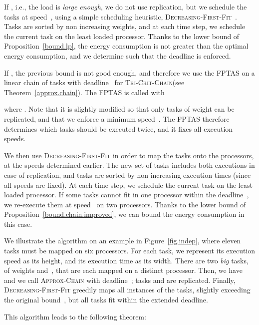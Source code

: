 \documentclass[a4paper]{article}
\theoremstyle{plain}
\theoremstyle{definition}
\theoremstyle{remark}
\newcommand{\dff}{\textsc{Dec\-reasing-First-Fit}\xspace}
\newcommand{\approxchain}{\textsc{Ap\-prox-Chain}}
\newcommand{\chain}{\textsc{Tri-Crit-Chain}\xspace}
\begin{document}
\begin{compactitem}


\item If , i.e., the load is {\em large enough}, we do not use replication, but we
  schedule the tasks at
  speed~, using a simple scheduling heuristic, \dff~\cite{Graham69}. Tasks
  are sorted by non increasing weights, and at each time step, we
  schedule the current task on the least loaded processor. Thanks to
  the lower bound of Proposition~\ref{bound.lp}, the energy
  consumption is not greater than the optimal energy consumption, and
  we determine  such that the deadline is
  enforced.  

\item If , the previous bound is not good enough, and therefore we use the
  FPTAS on a linear chain of tasks with deadline~ for \chain (see
  Theorem~\ref{approx.chain}).  The FPTAS is called with
  
  where . Note that it is
  slightly modified so that only tasks of weight
   can be replicated, and that we enforce a
  minimum speed~.  The FPTAS therefore determines which tasks
  should be executed twice, and it fixes all execution speeds.
   
  We then use \dff in order to map the tasks onto the  processors,
  at the speeds determined earlier. The new set of tasks includes both
  executions in case of replication, and tasks are sorted by non
  increasing execution times (since all speeds are fixed). At each
  time step, we schedule the current task on the least loaded
  processor. If some tasks cannot fit in one processor within the
  deadline~, we re-execute them at speed~ on two processors. Thanks to the lower bound of
  Proposition~\ref{bound.chain.improved}, we can bound the energy
  consumption in this case.
\end{compactitem}

\medskip
\noindent We illustrate the algorithm on an example in
Figure~\ref{fig.indep}, where eleven tasks must be mapped on six
processors. For each task, we represent its execution speed as its
height, and its execution time as its width. There are two {\em big}
tasks, of weights  and~, that are each mapped on a distinct
processor. Then, we have  and we call \approxchain\xspace with
deadline~; tasks  and  are replicated. Finally, \dff
greedily maps all instances of the tasks, slightly exceeding the
original bound~, but all tasks fit within the extended deadline.

\medskip
This algorithm leads to the following theorem: 
\end{document}
